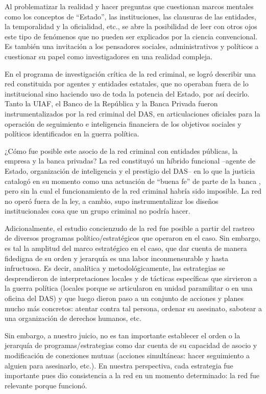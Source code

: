 \documentclass[
  spanish,
  11pt,
  a4paper,
]{scrbook}
\begin{document}
Al problematizar la realidad y hacer preguntas que cuestionan marcos
mentales como los conceptos de ``Estado'', las instituciones, las
clausuras de las entidades, la temporalidad y la oficialidad, etc., se
abre la posibilidad de leer con otros ojos este tipo de fenómenos que no
pueden ser explicados por la ciencia convencional. Es también una
invitación a los pensadores sociales, administrativos y políticos a
cuestionar su papel como investigadores en una realidad compleja.

En el programa de investigación crítica de la red criminal, se logró
describir una red constituida por agentes y entidades estatales, que no
operaban fuera de lo institucional sino haciendo uso de toda la potencia
del Estado, por así decirlo. Tanto la UIAF, el Banco de la República y
la Banca Privada fueron instrumentalizados por la red criminal del DAS,
en articulaciones oficiales para la operación de seguimiento e
inteligencia financiera de los objetivos sociales y políticos
identificados en la guerra política.

¿Cómo fue posible este asocio de la red criminal con entidades públicas,
la empresa y la banca privadas? La red constituyó un híbrido funcional
--agente de Estado, organización de inteligencia y el prestigio del
DAS-- en lo que la justicia catalogó en su momento como una actuación de
``buena fe'' de parte de la banca \autocite[63]{Martinez2016}, pero sin
la cual el funcionamiento de la red criminal habría sido imposible. La
red no operó fuera de la ley, a cambio, supo instrumentalizar los
diseños institucionales cosa que un grupo criminal no podría hacer.

Adicionalmente, el estudio concienzudo de la red fue posible a partir
del rastreo de diversos programas político/estratégicos que operaron en
el caso. Sin embargo, es tal la amplitud del marco estratégico en el
caso, que dar cuenta de manera fidedigna de su orden y jerarquía es una
labor inconmensurable y hasta infructuosa. Es decir, analítica y
metodológicamente, las estrategias se desprendieron de interpretaciones
locales y de tácticas específicas que sirvieron a la guerra política
(locales porque se articularon en unidad paramilitar o en una oficina
del DAS) y que luego dieron paso a un conjunto de acciones y planes
mucho más concretos: atentar contra tal persona, ordenar su asesinato,
sabotear a una organización de derechos humanos, etc.

Sin embargo, a nuestro juicio, no es tan importante establecer el orden
o la jerarquía de programas/estrategias como dar cuenta de su capacidad
de asocio y modificación de conexiones mutuas (acciones simultáneas:
hacer seguimiento a alguien para asesinarlo, etc.). En nuestra
perspectiva, cada estrategia fue importante pues dio consistencia a la
red en un momento determinado: la red fue relevante porque funcionó.
\end{document}
